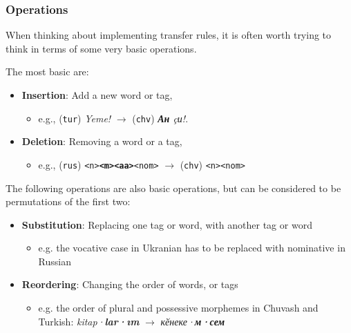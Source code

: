 \documentclass[10pt,xetex]{beamer} %
\begin{document}
\begin{frame}
  \frametitle{Operations}

When thinking about implementing transfer rules, it is often worth trying to think in terms of some very basic operations. 

The most basic are:

\begin{itemize}
  \item {\bf Insertion}: Add a new word or tag, 
  \begin{itemize}
    \item e.g., (\texttt{tur}) {\em Yeme!} $\rightarrow$ (\texttt{chv}) {\em {\bf Ан} çи!}. 
  \end{itemize}
  \item {\bf Deletion}: Removing a word or a tag, 
  \begin{itemize}
    \item e.g., (\texttt{rus}) {\tt <n>{\bf <m><aa>}<nom>} $\rightarrow$ (\texttt{chv}) {\tt <n><nom>}
  \end{itemize}
\end{itemize}

The following operations are also basic operations, but can be considered to be permutations of the first two:

\begin{itemize}
  \item {\bf Substitution}: Replacing one tag or word, with another tag or word
  \begin{itemize}
    \item e.g. the vocative case in Ukranian has to be replaced with nominative in Russian 
  \end{itemize}
  \item {\bf Reordering}: Changing the order of words, or tags
  \begin{itemize}
    \item e.g. the order of plural and possessive morphemes in Chuvash and Turkish: {\em kitap·{\bf lar·ım}} $\rightarrow$ {\em кӗнеке·{\bf м·сем}}
  \end{itemize}
\end{itemize}

\end{frame}
\end{document}
